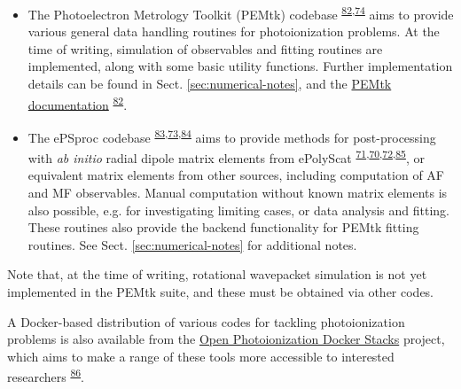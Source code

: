 \documentclass[10pt]{article}
\begin{document}
\begin{itemize}
\item The Photoelectron Metrology Toolkit (PEMtk) codebase \textsuperscript{\hyperref[csl:82]{82},\hyperref[csl:74]{74}} aims to provide various general data handling routines for photoionization problems. At the time of writing, simulation of observables and fitting routines are implemented, along with some basic utility functions. Further implementation details can be found in Sect. \ref{sec:numerical-notes}, and the \href{https://pemtk.readthedocs.io/en/latest/about.html}{PEMtk documentation} \textsuperscript{\hyperref[csl:82]{82}}.
\item The ePSproc codebase \textsuperscript{\hyperref[csl:83]{83},\hyperref[csl:73]{73},\hyperref[csl:84]{84}} aims to provide methods for post-processing with \textit{ab initio} radial dipole matrix elements from ePolyScat \textsuperscript{\hyperref[csl:71]{71},\hyperref[csl:70]{70},\hyperref[csl:72]{72},\hyperref[csl:85]{85}}, or equivalent matrix elements from other sources, including computation of AF and MF observables. Manual computation without known matrix elements is also possible, e.g. for investigating limiting cases, or data analysis and fitting. These routines also provide the backend functionality for PEMtk fitting routines. See Sect. \ref{sec:numerical-notes} for additional notes.
\end{itemize}

Note that, at the time of writing, rotational wavepacket simulation is not yet implemented in the PEMtk suite, and these must be obtained via other codes. %

A Docker-based distribution of various codes for tackling photoionization problems is also available from the \href{https://github.com/phockett/open-photoionization-docker-stacks}{Open Photoionization Docker Stacks} project, which aims to make a range of these tools more accessible to interested researchers \textsuperscript{\hyperref[csl:86]{86}}.







\end{document}

